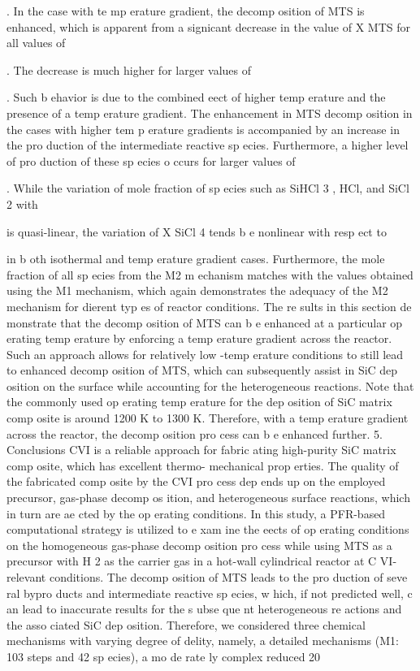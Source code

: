 \documentclass[10pt, letterpaper]{article}
\begin{document}
.
In the case with te mp erature gradient, the decomp osition of MTS is enhanced, which is apparent from a
signicant decrease in the value of
X
MTS
for all values of

. The decrease is much higher for larger values of

.
Such b ehavior is due to the combined eect of higher temp erature and the presence of a temp erature gradient.
The enhancement in MTS decomp osition in the cases with higher tem p erature gradients is accompanied by
an increase in the pro duction of the intermediate reactive sp ecies. Furthermore, a higher level of pro duction
of these sp ecies o ccurs for larger values of

. While the variation of mole fraction of sp ecies such as SiHCl
3
,
HCl, and SiCl
2
with

is quasi-linear, the variation of
X
SiCl
4
tends b e nonlinear with resp ect to

in
b oth isothermal and temp erature gradient cases. Furthermore, the mole fraction of all sp ecies from the
M2 m echanism matches with the values obtained using the M1 mechanism, which again demonstrates the
adequacy of the M2 mechanism for dierent typ es of reactor conditions.
The re sults in this section de monstrate that the decomp osition of MTS can b e enhanced at a particular
op erating temp erature by enforcing a temp erature gradient across the reactor. Such an approach allows for
relatively low -temp erature conditions to still lead to enhanced decomp osition of MTS, which can subsequently
assist in SiC dep osition on the surface while accounting for the heterogeneous reactions. Note that the
commonly used op erating temp erature for the dep osition of SiC matrix comp osite is around 1200 K to 1300
K. Therefore, with a temp erature gradient across the reactor, the decomp osition pro cess can b e enhanced
further.
5. Conclusions
CVI is a reliable approach for fabric ating high-purity SiC matrix comp osite, which has excellent thermo-
mechanical prop erties. The quality of the fabricated comp osite by the CVI pro cess dep ends up on the
employed precursor, gas-phase decomp os ition, and heterogeneous surface reactions, which in turn are ae cted
by the op erating conditions. In this study, a PFR-based computational strategy is utilized to e xam ine the
eects of op erating conditions on the homogeneous gas-phase decomp osition pro cess while using MTS as a
precursor with H
2
as the carrier gas in a hot-wall cylindrical reactor at C VI-relevant conditions.
The decomp osition of MTS leads to the pro duction of seve ral bypro ducts and intermediate reactive
sp ecies, w hich, if not predicted well, c an lead to inaccurate results for the s ubse que nt heterogeneous re actions
and the asso ciated SiC dep osition. Therefore, we considered three chemical mechanisms with varying degree
of delity, namely, a detailed mechanisms (M1: 103 steps and 42 sp ecies), a mo de rate ly complex reduced
20
\end{document}
